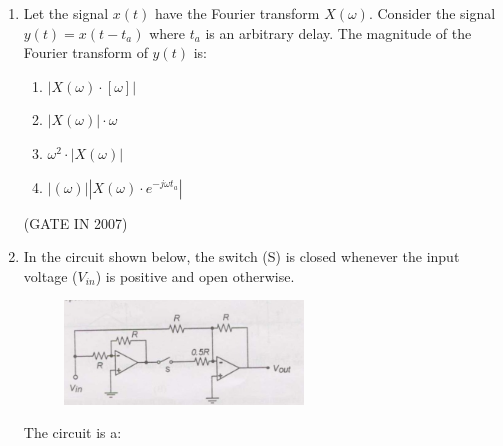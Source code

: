 \documentclass[journal]{IEEEtran}
\begin{document}
\begin{enumerate}
\begin{multicols}{4}
\begin{enumerate}
    \item $-2/3$
    \item $2/3$
    \item $3/2$
    \item $3$
\end{enumerate}
\end{multicols}
\hfill(GATE IN 2007)
\item Let the signal $x(t)$ have the Fourier transform $X(\omega)$. Consider the signal $y(t) = x(t - t_a)$ where $t_a$ is an arbitrary delay. The magnitude of the Fourier transform of $y(t)$ is:

\begin{multicols}{4}
\begin{enumerate}
    \item $|X(\omega) \cdot [\omega]|$
    \item $|X(\omega)| \cdot \omega$
    \item $\omega^2 \cdot |X(\omega)|$
    \item $|(\omega)||X(\omega) \cdot e^{-j\omega t_a}|$
\end{enumerate}
\end{multicols}
\hfill(GATE IN 2007)
\item In the circuit shown below, the switch (S) is closed whenever the input voltage ($V_{in}$) is positive and open otherwise.
\begin{figure}[H]
    \centering
      \includegraphics[width=0.6\textwidth]{48.jpg} 
      \caption{}
\label{fig:fig48} 
\end{figure}
The circuit is a:


\end{enumerate}
\end{document}
